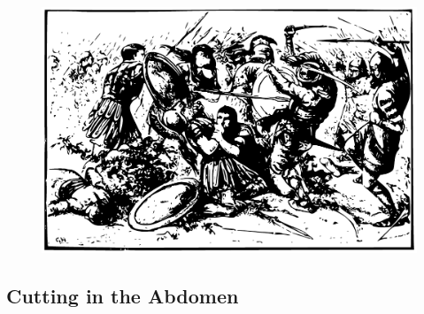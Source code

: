 \documentclass[12pt]{book}  %
\begin{document}
\begin{figure}[h]
    \centering
    \includegraphics[width=\textwidth]{./images/combat04.pdf}
\end{figure}

\subsection{Cutting in the Abdomen}
\end{document}
